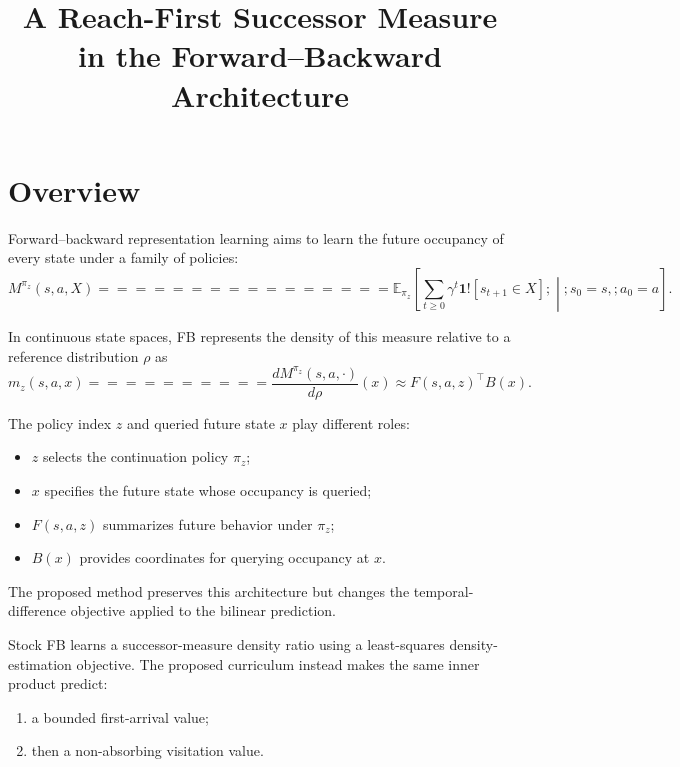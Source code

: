 \documentclass[10pt]{article}
\title{A Reach-First Successor Measure in the Forward--Backward Architecture}
\author{}
\date{}
\newcommand{\E}{\mathbb{E}}
\newcommand{\ind}[1]{\mathbf{1}!\left[#1\right]}
\begin{document}
\maketitle

\section{Overview}

Forward--backward representation learning aims to learn the future occupancy of every
state under a family of policies:
\begin{equation}
M^{\pi_z}(s,a,X)
================

\E_{\pi_z}
\left[
\sum_{t\geq0}
\gamma^t
\ind{s_{t+1}\in X}
;\middle|;
s_0=s,;a_0=a
\right].
\label{eq:successor-measure}
\end{equation}

In continuous state spaces, FB represents the density of this measure relative to a
reference distribution $\rho$ as
\begin{equation}
m_z(s,a,x)
==========

\frac{dM^{\pi_z}(s,a,\cdot)}{d\rho}(x)
\approx
F(s,a,z)^\top B(x).
\label{eq:fb-factorization}
\end{equation}

The policy index $z$ and queried future state $x$ play different roles:
\begin{itemize}
\item $z$ selects the continuation policy $\pi_z$;
\item $x$ specifies the future state whose occupancy is queried;
\item $F(s,a,z)$ summarizes future behavior under $\pi_z$;
\item $B(x)$ provides coordinates for querying occupancy at $x$.
\end{itemize}

The proposed method preserves this architecture but changes the temporal-difference
objective applied to the bilinear prediction.

Stock FB learns a successor-measure density ratio using a least-squares density-estimation
objective.
The proposed curriculum instead makes the same inner product predict:
\begin{enumerate}
\item a bounded first-arrival value;
\item then a non-absorbing visitation value.
\end{enumerate}
\end{document}
